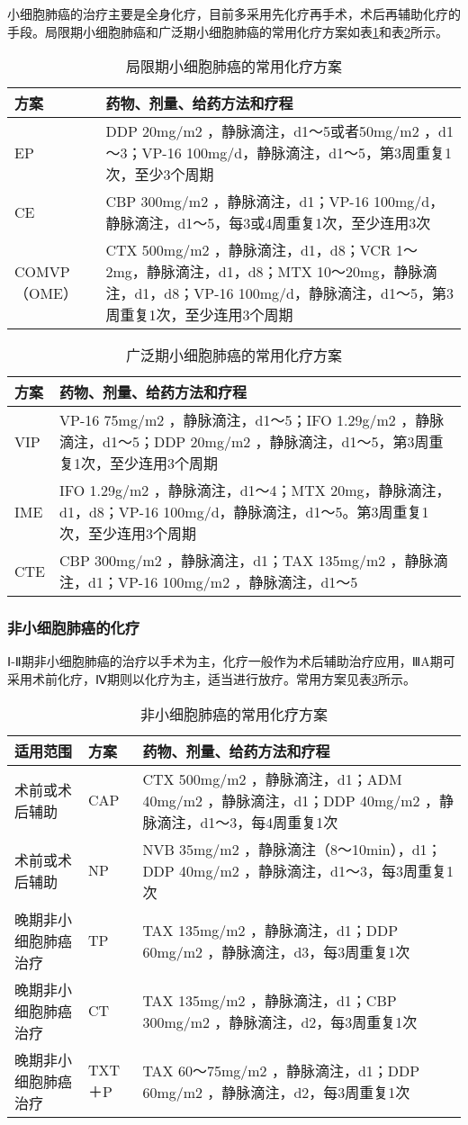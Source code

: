 小细胞肺癌的治疗主要是全身化疗，目前多采用先化疗再手术，术后再辅助化疗的手段。局限期小细胞肺癌和广泛期小细胞肺癌的常用化疗方案如表\ref{tab17-1}和表\ref{tab17-2}所示。

\begin{longtable}[]{lp{7cm}}
    \caption{局限期小细胞肺癌的常用化疗方案}
    \label{tab17-1}\\
\toprule
方案 & 药物、剂量、给药方法和疗程\tabularnewline
\midrule
\endhead
EP & DDP 20mg/m{2} ，静脉滴注，d1～5或者50mg/m{2} ，d1～3；VP-16
100mg/d，静脉滴注，d1～5，第3周重复1次，至少3个周期\tabularnewline
CE & CBP 300mg/m{2} ，静脉滴注，d1；VP-16
100mg/d，静脉滴注，d1～5，每3或4周重复1次，至少连用3次\tabularnewline
COMVP（OME） & CTX 500mg/m{2} ，静脉滴注，d1，d8；VCR
1～2mg，静脉滴注，d1，d8；MTX 10～20mg，静脉滴注，d1，d8；VP-16
100mg/d，静脉滴注，d1～5，第3周重复1次，至少连用3个周期\tabularnewline
\bottomrule
\end{longtable}

\begin{longtable}[]{lp{7cm}}
    \caption{广泛期小细胞肺癌的常用化疗方案}
    \label{tab17-2}\\
\toprule
方案 & 药物、剂量、给药方法和疗程\tabularnewline
\midrule
\endhead
VIP & VP-16 75mg/m{2} ，静脉滴注，d1～5；IFO 1.29g/m{2}
，静脉滴注，d1～5；DDP 20mg/m{2}
，静脉滴注，d1～5，第3周重复1次，至少连用3个周期\tabularnewline
IME & IFO 1.29g/m{2} ，静脉滴注，d1～4；MTX
20mg，静脉滴注，d1，d8；VP-16
100mg/d，静脉滴注，d1～5。第3周重复1次，至少连用3个周期\tabularnewline
CTE & CBP 300mg/m{2} ，静脉滴注，d1；TAX 135mg/m{2}
，静脉滴注，d1；VP-16 100mg/m{2} ，静脉滴注，d1～5\tabularnewline
\bottomrule
\end{longtable}

\subsubsection{非小细胞肺癌的化疗}

Ⅰ-Ⅱ期非小细胞肺癌的治疗以手术为主，化疗一般作为术后辅助治疗应用，ⅢA期可采用术前化疗，Ⅳ期则以化疗为主，适当进行放疗。常用方案见表\ref{tab17-3}所示。
　
\begin{longtable}[]{p{5cm}p{5cm}p{5cm}}
    \caption{非小细胞肺癌的常用化疗方案}
    \label{tab17-3}\\
\toprule
适用范围&方案&药物、剂量、给药方法和疗程\tabularnewline
\midrule
\endhead
术前或术后辅助&CAP&CTX 500mg/m{2} ，静脉滴注，d1；ADM 40mg/m{2} ，静脉滴注，d1；DDP
40mg/m{2} ，静脉滴注，d1～3，每4周重复1次\\
术前或术后辅助&NP&NVB 35mg/m{2} ，静脉滴注（8～10min），d1；DDP 40mg/m{2}
，静脉滴注，d1～3，每3周重复1次\\
晚期非小细胞肺癌治疗&TP&TAX  135mg/m{2} ，静脉滴注，d1；DDP 60mg/m{2}
，静脉滴注，d3，每3周重复1次\\
晚期非小细胞肺癌治疗&CT&TAX 135mg/m{2} ，静脉滴注，d1；CBP 300mg/m{2}
，静脉滴注，d2，每3周重复1次\\
晚期非小细胞肺癌治疗&TXT＋P&TAX 60～75mg/m{2} ，静脉滴注，d1；DDP 60mg/m{2}
，静脉滴注，d2，每3周重复1次\\
\bottomrule
\end{longtable}

